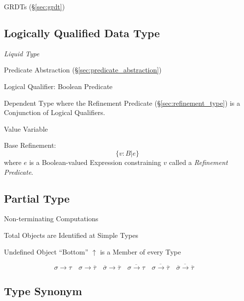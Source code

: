 \fist GRDTs (\S\ref{sec:grdt})



\subsection{Logically Qualified Data Type}
\label{sec:logically_qualified}

\cite{rondon-kawaguchi-jhala08}

\emph{Liquid Type}

Predicate Abstraction (\S\ref{sec:predicate_abstraction})

Logical Qualifier: Boolean Predicate

Dependent Type where the Refinement Predicate
(\S\ref{sec:refinement_type}) is a Conjunction of Logical Qualifiers.

Value Variable

Base Refinement:
\[
  \{ v : B | e \}
\]
where $e$ is a Boolean-valued Expression constraining $v$ called a
\emph{Refinement Predicate}.



\subsection{Partial Type}\label{sec:partial_type}

\cite{thompson99}

Non-terminating Computations

Total Objects are Identified at Simple Types

Undefined Object ``Bottom'' $\uparrow$ is a Member of every Type

\[
  \sigma \rightarrow \tau \quad
  \sigma \rightarrow \overline{\tau} \quad
  \overline{\sigma} \rightarrow \overline{\tau} \quad
  \overline{\sigma \rightarrow \tau} \quad
  \overline{\sigma \rightarrow \overline{\tau}} \quad
  \overline{\overline{\sigma} \rightarrow \overline{\tau}} \quad
\]



\subsection{Type Synonym}\label{sec:type_synonym}

